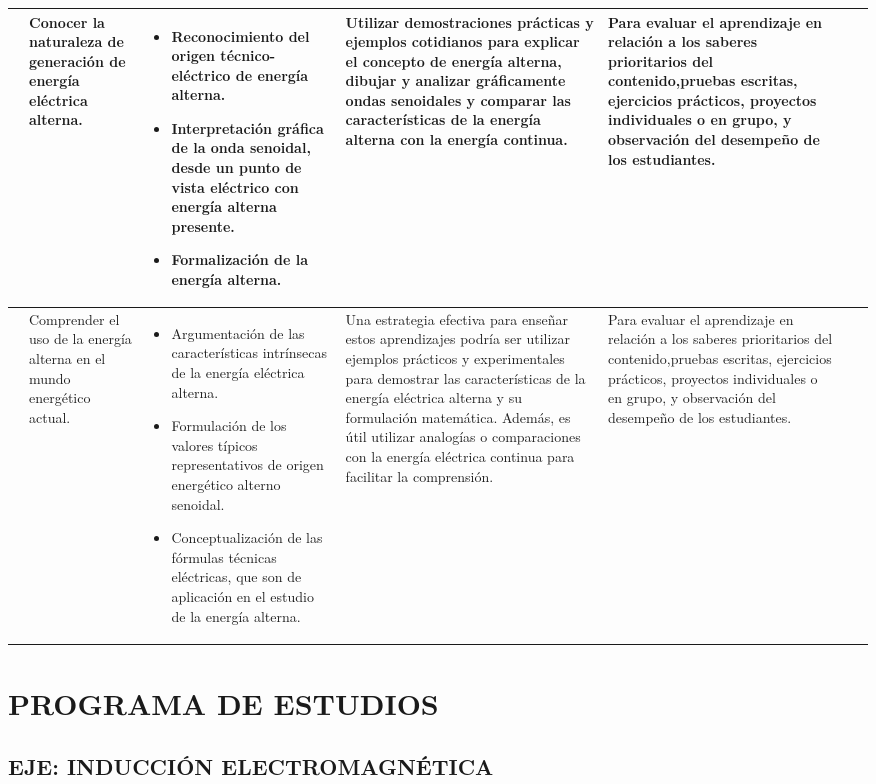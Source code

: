 \documentclass[../main]{subfiles}
\newcommand{\vertical}[1]{\rotatebox[origin=r]{90}{#1}}
\newcommand{\tiempos}{\vertical{6 semanas}}
\newcommand{\evaluacion}{Para evaluar el aprendizaje en relación a los saberes prioritarios del contenido,pruebas escritas, ejercicios prácticos, proyectos individuales o en
grupo, y observación del desempeño de los estudiantes.}
\newcommand{\recursos}{\vertical{Pizarrón, proyectores, videos, simuladores, libros de texto, materiales manipulativos y plataformas digitales}}
\begin{document}
\begin{longtable}[h!]{|p{.3cm}|p{1.5cm}|p{4cm}|p{4cm}|p{1.5cm}|p{.5cm}|p{.5cm}|}
\vertical{PRINCIPIOS FUNDAMENTALES DE LA ENERGÍA ALTERNA} & Conocer la naturaleza de
generación de energía
eléctrica alterna.  & \begin{itemize}
    \item Reconocimiento del origen técnico-eléctrico de energía
alterna.
\item Interpretación gráfica de la onda senoidal, desde un punto
de vista eléctrico con energía alterna presente.
\item Formalización de la energía alterna. 
\end{itemize}& Utilizar demostraciones prácticas y ejemplos cotidianos para explicar el concepto de energía alterna, dibujar y analizar gráficamente ondas senoidales y comparar las características de la energía alterna con la energía continua. &\evaluacion & \recursos & \tiempos \\
\hline
& Comprender el uso de la
energía alterna en el
mundo energético actual. & \begin{itemize}
    \item  Argumentación de las características intrínsecas de la
energía eléctrica alterna.
\item Formulación de los valores típicos representativos de
origen energético alterno senoidal.
\item Conceptualización de las fórmulas técnicas eléctricas, que
son de aplicación en el estudio de la energía alterna. 
\end{itemize} & Una estrategia efectiva para enseñar estos aprendizajes podría ser utilizar ejemplos prácticos y experimentales para demostrar las características de la energía eléctrica alterna y su formulación matemática. Además, es útil utilizar analogías o comparaciones con la energía eléctrica continua para facilitar la comprensión. &\evaluacion & \recursos & \tiempos  \\ \hline

\end{longtable}

\newpage
\section{PROGRAMA DE ESTUDIOS}
 \subsection{EJE: INDUCCIÓN ELECTROMAGNÉTICA}
\end{document}
